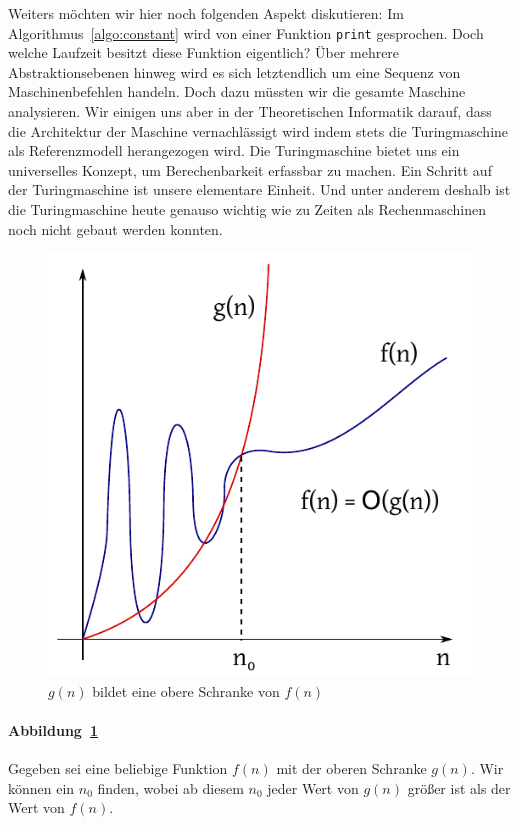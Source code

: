 Weiters möchten wir hier noch folgenden Aspekt diskutieren: Im Algorithmus~\ref{algo:constant} wird von einer Funktion \texttt{print} gesprochen. Doch welche Laufzeit besitzt diese Funktion eigentlich? Über mehrere Abstraktionsebenen hinweg wird es sich letztendlich um eine Sequenz von Maschinenbefehlen handeln. Doch dazu müssten wir die gesamte Maschine analysieren. Wir einigen uns aber in der Theoretischen Informatik darauf, dass die Architektur der Maschine vernachlässigt wird indem stets die Turingmaschine als Referenzmodell herangezogen wird. Die Turingmaschine bietet uns ein universelles Konzept, um Berechenbarkeit erfassbar zu machen. Ein Schritt auf der Turingmaschine ist unsere elementare Einheit. Und unter anderem deshalb ist die Turingmaschine heute genauso wichtig wie zu Zeiten als Rechenmaschinen noch nicht gebaut werden konnten.
%
\begin{figure}[h]
 \begin{center}
  \includegraphics{img/upper_bound.pdf}
  \caption{$g(n)$ bildet eine obere Schranke von $f(n)$}
  \label{fig:upper}
 \end{center}
\end{figure}

\paragraph{Abbildung~\ref{fig:upper}}
Gegeben sei eine beliebige Funktion $f(n)$ mit der oberen Schranke $g(n)$. Wir können ein $n_0$ finden, wobei ab diesem $n_0$ jeder Wert von $g(n)$ größer ist als der Wert von $f(n)$.
%
